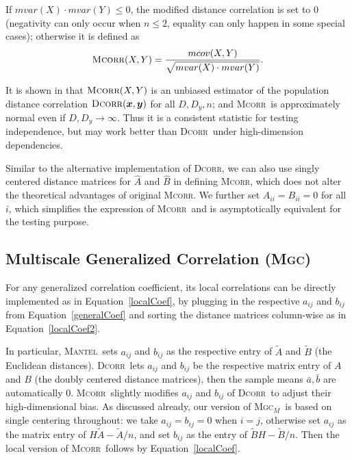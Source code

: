 \documentclass[11pt]{article}
\providecommand{\sct}[1]{{\normalfont\textsc{#1}}}
\providecommand{\mb}[1]{\boldsymbol{#1}}
\newcommand{\Mgc}{\sct{Mgc}}
\newcommand{\Mgcm}{\sct{Mgc$_M$}}
\newcommand{\Dcorr}{\sct{Dcorr}}
\newcommand{\Mcorr}{\sct{Mcorr}}
\newcommand{\Mantel}{\sct{Mantel}}
\begin{document}
If $mvar(X) \cdot mvar(Y) \leq 0$, the modified distance correlation is set to $0$ (negativity can only occur when $n\leq 2$, equality can only happen in some special cases); otherwise it is defined as
\begin{equation*}
\Mcorr(X,Y)=\frac{mcov(X,Y)}{\sqrt{mvar(X) \cdot mvar(Y)}}.
\end{equation*}

It is shown in \cite{SzekelyRizzo2013a} that $\Mcorr(X,Y)$ is an unbiased estimator of the population distance correlation $\Dcorr(\mb{x},\mb{y})$ for all $D, D_{y}, n$; and \Mcorr~is approximately normal even if $D,D_{y} \rightarrow \infty$. Thus it is a consistent statistic for testing independence, but may work better than \Dcorr~under high-dimension dependencies.

Similar to the alternative implementation of \Dcorr, we can also use singly centered distance matrices for $\hat{A}$ and $\hat{B}$ in defining \Mcorr, which does not alter the theoretical advantages of original \Mcorr. We further set $A_{ii}=B_{ii}=0$ for all $i$, which simplifies the expression of \Mcorr~and is asymptotically equivalent for the testing purpose.


\subsection{Multiscale Generalized Correlation (\Mgc)}
\label{appen:mgc}
For any generalized correlation coefficient, its local correlations can be directly implemented as in Equation~\ref{localCoef}, by plugging in the respective $a_{ij}$ and $b_{ij}$ from Equation~\ref{generalCoef} and sorting the distance matrices column-wise as in Equation~\ref{localCoef2}.

In particular, \Mantel~sets $a_{ij}$ and $b_{ij}$ as the respective entry of $\tilde{A}$ and $\tilde{B}$ (the Euclidean distances). \Dcorr~lets $a_{ij}$ and $b_{ij}$ be the respective matrix entry of $A$ and $B$ (the doubly centered distance matrices), then the sample means $\bar{a}, \bar{b}$ are automatically $0$. \Mcorr~slightly modifies $a_{ij}$ and $b_{ij}$ of \Dcorr~to adjust their high-dimensional bias. As discussed already, our version of \Mgcm~is based on single centering throughout: we take $a_{ij}=b_{ij}=0$ when $i=j$, otherwise set $a_{ij}$ as the matrix entry of $H\tilde{A}-\tilde{A}/n$, and set $b_{ij}$ as the entry of $\tilde{B}H-\tilde{B}/n$. Then the local version of \Mcorr~follows by Equation~\ref{localCoef}.
\end{document}
